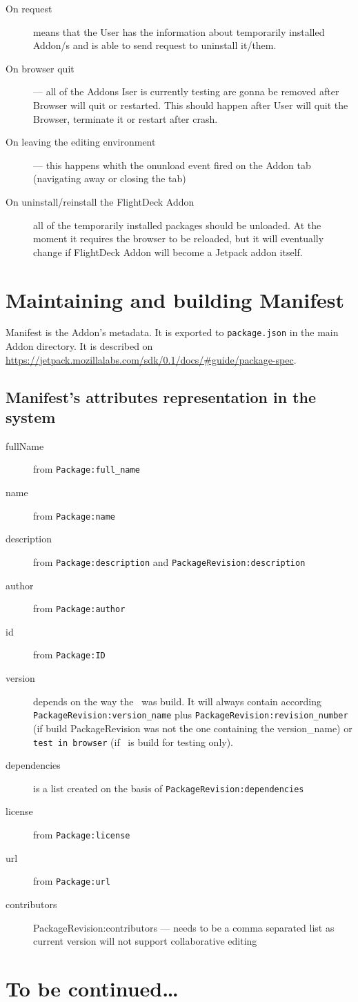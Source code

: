 \documentclass[10pt]{article}
\begin{document}
			\begin{description}
				\item[On request] means that the User has the information about temporarily installed Addon/s 
					and is able to send request to uninstall it/them.
				\item[On browser quit] --- all of the Addons Iser is currently testing are gonna be removed 
					after Browser will quit or restarted. This should happen after User will quit the Browser,
					terminate it or restart after crash.
				\item[On leaving the editing environment] --- this happens whith the onunload event fired 
					on the Addon tab (navigating away or closing the tab)
				\item[On uninstall/reinstall the FlightDeck Addon] all of the temporarily installed 
					packages should be unloaded. At the moment it requires the browser to be reloaded, but
					it will eventually change if FlightDeck Addon will become a Jetpack addon itself.
			\end{description}
	
\section{Maintaining and building Manifest}

	Manifest is the Addon's metadata. It is exported to {\tt package.json} in the main Addon directory. It is 
	described on \url{https://jetpack.mozillalabs.com/sdk/0.1/docs/\#guide/package-spec}.
	
	\subsection{Manifest's attributes representation in the system}
	
	\begin{description}
		\item[fullName] from {\tt Package:full\_name}
		\item[name] from {\tt Package:name}
		\item[description] from {\tt Package:description} and {\tt PackageRevision:description}
		\item[author] from {\tt Package:author}
		\item[id] from {\tt Package:ID}
		\item[version] depends on the way the \xpi\ was build. It will always contain according 
			{\tt PackageRevision:version\_name} plus {\tt PackageRevision:revision\_number} 
			(if build PackageRevision was not the one containing the version\_name) or  
			{\tt test in browser} (if \xpi\ is build for testing only).
		\item[dependencies] is a list created on the basis of {\tt PackageRevision:dependencies}
		\item[license] from {\tt Package:license}
		\item[url] from {\tt Package:url}
		\item[contributors] {PackageRevision:contributors} --- needs to be a comma separated list as 
			current version will not support collaborative editing 
	\end{description}
	
	
	
\pagebreak
\section*{To be continued\ldots}
\end{document}
